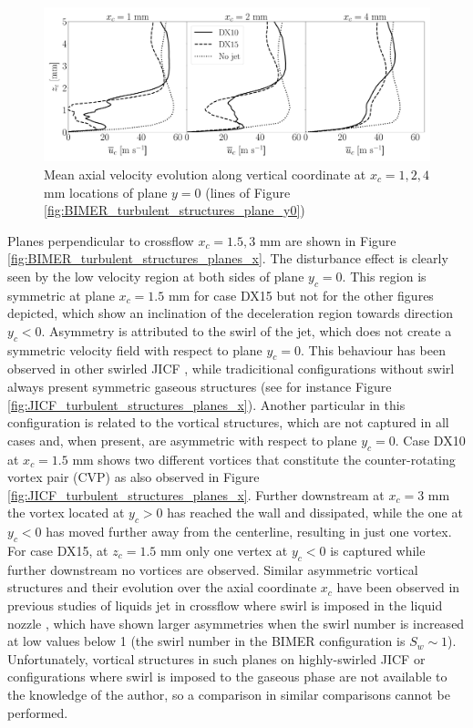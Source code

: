 \begin{figure}[ht]
\centering
   \includegraphics[scale=0.24]{./part3_applications/figures_ch8_resolved/turbulent_structures/lines_y0_along_z_ux_mean}
\caption{Mean axial velocity evolution along vertical coordinate at $x_c = 1, 2, 4$ mm locations of plane $y = 0$ (lines of Figure \ref{fig:BIMER_turbulent_structures_plane_y0})}
\label{fig:BIMER_sps_lines_y0_along_z_ux_mean}
\end{figure}


Planes perpendicular to crossflow $x_c = 1.5, 3$ mm are shown in Figure \ref{fig:BIMER_turbulent_structures_planes_x}. The disturbance effect is clearly seen by the low velocity region at both sides of plane $y_c = 0$. This region is symmetric at plane $x_c = 1.5$ mm for case DX15 but not for the other figures depicted, which show an inclination of the deceleration region towards direction $y_c < 0$. Asymmetry is attributed to the swirl of the jet, which does not create a symmetric velocity field with respect to plane $y_c = 0$.  This behaviour has been observed in other swirled JICF , while tradicitional configurations without swirl always present symmetric gaseous structures (see for instance Figure \ref{fig:JICF_turbulent_structures_planes_x}). Another particular in this configuration is related to the vortical structures, which are not captured in all cases and, when present, are asymmetric with respect to plane $y_c = 0$. Case DX10 at $x_c = 1.5$ mm shows two different vortices that constitute the counter-rotating vortex pair (CVP) as also observed in Figure \ref{fig:JICF_turbulent_structures_planes_x}. Further downstream at $x_c = 3$ mm the vortex located at $y_c > 0$ has reached the wall and dissipated, while the one at $y_c < 0$ has moved further away from the centerline, resulting in just one vortex. For case DX15, at $z_c = 1.5$ mm only one vertex at $y_c < 0$ is captured while further downstream no vortices are observed. Similar asymmetric vortical structures and their evolution over the axial coordinate $x_c$ have been observed in previous studies of liquids jet in crossflow where swirl is imposed in the liquid nozzle , which have shown larger asymmetries when the swirl number is increased at low values below 1 (the swirl number in the BIMER configuration is $S_w \sim 1$). Unfortunately, vortical structures in such planes on highly-swirled JICF or configurations where swirl is imposed to the gaseous phase are not available to the knowledge of the author, so a comparison in similar comparisons cannot be performed.

